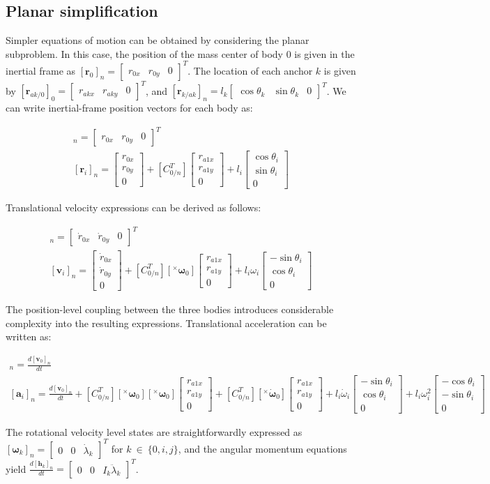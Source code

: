 \documentclass{aiaa-tc}
\newcommand{\br}[2]{[#1]_{#2}} %
\newcommand{\tvect}[3]{\begin{bmatrix}#1\\#2\\#3\end{bmatrix}}%
\newcommand{\tvecth}[3]{\begin{bmatrix}#1&#2&#3\end{bmatrix}}%
\newcommand{\B}[1]{\textbf{#1}} %
\newcommand{\BG}[1]{{\bm #1}}           %
\newcommand{\ddt}[1]{\frac{d#1}{dt}} %
\newcommand{\squig}[1]{\ensuremath{[{}^{\times} #1]}} %
\begin{document}
\subsection{Planar simplification}

Simpler equations of motion can be obtained by considering the planar subproblem. In this case, the position of the mass center of body 0 is given in the inertial frame as $\br{\B{r}_0}{n} = \tvecth{r_{0x}}{r_{0y}}{0}^T$. The location of each anchor $k$ is given by $\br{\B{r}_{ak/0}}{0} = \tvecth{r_{akx}}{r_{aky}}{0}^T$, and $\br{\B{r}_{k/ak}}{n} = l_k\tvecth{\cos{\theta_k}}{\sin{\theta_k}}{0}^T$. We can write inertial-frame position vectors for each body as:

\begin{align}
\br{\B{r}_0}{n} = \tvecth{r_{0x}}{r_{0y}}{0}^T\\
\br{\B{r}_i}{n} = \tvect{r_{0x}}{r_{0y}}{0} + [C_{0/n}^T]\tvect{r_{a1x}}{r_{a1y}}{0} + l_i\tvect{\cos{\theta_i}}{\sin{\theta_i}}{0}
\end{align}

Translational velocity expressions can be derived as follows:

\begin{align}
\br{\B{v}_0}{n} = \tvecth{\dot{r}_{0x}}{\dot{r}_{0y}}{0}^T\\
\br{\B{v}_i}{n} = \tvect{\dot{r}_{0x}}{\dot{r}_{0y}}{0} + [C_{0/n}^T]\squig{\BG{\omega}_0}\tvect{r_{a1x}}{r_{a1y}}{0} + l_i\omega_i \tvect{-\sin{\theta_i}}{\cos{\theta_i}}{0}
\end{align}

The position-level coupling between the three bodies introduces considerable complexity into the resulting expressions. Translational acceleration can be written as:

\begin{align}
\br{\B{a}_0}{n} = \ddt{\br{\B{v}_0}{n}}\\
\br{\B{a}_i}{n} = \ddt{\br{\B{v}_0}{n}} + [C_{0/n}^T]\squig{\BG{\omega}_0}\squig{\BG{\omega}_0}\tvect{r_{a1x}}{r_{a1y}}{0} + [C_{0/n}^T]\squig{\dot{\BG{\omega}}_0}\tvect{r_{a1x}}{r_{a1y}}{0} + l_i\dot{\omega}_i \tvect{-\sin{\theta_i}}{\cos{\theta_i}}{0} + l_i\omega_i^2 \tvect{-\cos{\theta_i}}{-\sin{\theta_i}}{0}
\end{align}

The rotational velocity level states are straightforwardly expressed as $\br{\BG{\omega}_k}{n} = \tvecth{0}{0}{\dot{\lambda}_k}^T$ for $k \ \in \ \{0,i,j\}$, and the angular momentum equations yield $\ddt{\br{\B{h}_k}{n}} = \tvecth{0}{0}{I_k\ddot{\lambda}_k}^T$.
\end{document}
